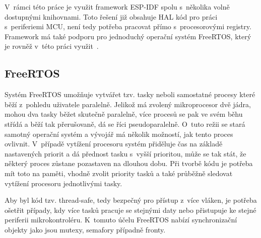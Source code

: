     V~rámci této práce je využit framework ESP-IDF spolu s~několika volně dostupnými knihovnami. Toto řešení již obsahuje HAL kód pro práci s~periferiemi MCU, není tedy potřeba pracovat přímo s~procesorovými registry. Framework má také podporu pro jednoduchý operační systém FreeRTOS, který je rovněž v~této práci využit~\cite{espressif-idf}. 

    \subsection{FreeRTOS}
        Systém FreeRTOS umožňuje vytvářet tzv. tasky neboli samostatné procesy které běží z~pohledu uživatele paralelně. Jelikož má zvolený mikroprocesor dvě jádra, mohou dva tasky běžet skutečně paralelně, více procesů se pak ve svém běhu střídá a běží tak přerušovaně, dá se říci pseudoparalelně. O~tuto režii se stará samotný operační systém a vývojář má několik možností, jak tento proces ovlivnit. V~případě vytížení procesoru systém přiděluje čas na základě nastavených priorit a dá přednost tasku s~vyšší prioritou, může se tak stát, že některý proces zůstane pozastaven na dlouhou dobu. Při tvorbě kódu je potřeba mít toto na paměti, vhodně zvolit priority tasků a také průběžně sledovat vytížení procesoru jednotlivými tasky.  

        Aby byl kód tzv. thread-safe, tedy bezpečný pro přístup z~více vláken, je potřeba ošetřit případy, kdy více tasků pracuje se stejnými daty nebo přistupuje ke stejné periferii mikrokontroléru. K~tomuto účelu FreeRTOS nabízí synchronizační objekty jako jsou mutexy, semafory případně fronty. 

